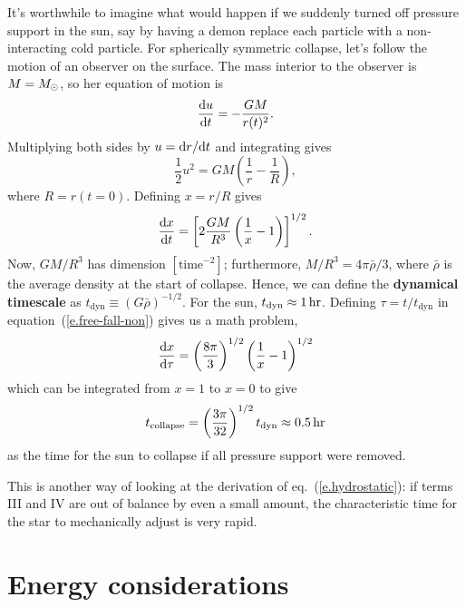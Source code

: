 It's worthwhile to imagine what would happen if we suddenly turned off pressure support in the sun, say by having a demon replace each particle with a non-interacting cold particle. For spherically symmetric collapse, let's follow the motion of an observer on the surface.  The mass interior to the observer is $M = M_\odot$, so her equation of motion is
\begin{equation}\label{e.free-fall-eq-motion}
\frac{\mathrm{d} u}{\mathrm{d} t} = -\frac{GM}{r(t)^{2}}.
\end{equation}
Multiplying both sides by $u = \mathrm{d} r/\mathrm{d} t$ and integrating gives
\[
\frac{1}{2} u^{2} = GM\left(\frac{1}{r} - \frac{1}{R}\right),
\]
where $R = r(t=0)$. Defining $x = r/R$ gives
\begin{equation}\label{e.free-fall-non}
\frac{\mathrm{d} x}{\mathrm{d} t} = \left[2 \frac{GM}{R^{3}}\left(\frac{1}{x}-1\right)\right]^{1/2}.
\end{equation}
Now, $GM/R^{3}$ has dimension $[\textrm{time}^{-2}]$; furthermore, $M/R^{3} = 4\pi\bar{\rho}/3$, where $\bar{\rho}$ is the average density at the start of collapse.
Hence, we can define the \textbf{dynamical timescale} as $t_{\mathrm{dyn}}\equiv (G\bar{\rho})^{-1/2}$.  For the sun, $t_{\mathrm{dyn}}\approx 1\,\mathrm{hr}$.  Defining $\tau = t/t_{\mathrm{dyn}}$ in equation~(\ref{e.free-fall-non}) gives us a math problem,
\[
\frac{\mathrm{d} x}{\mathrm{d}\tau} = \left(\frac{8\pi}{3}\right)^{1/2}\left(\frac{1}{x}-1\right)^{1/2}
\]
which can be integrated from $x = 1$ to $x=0$ to give
\[
t_{\mathrm{collapse}} = \left(\frac{3\pi}{32}\right)^{1/2}t_{\mathrm{dyn}} \approx 0.5\,\mathrm{hr}
\]
as the time for the sun to collapse if all pressure support were removed.

This is another way of looking at the derivation of eq.~(\ref{e.hydrostatic}): if terms III and IV are out of balance by even a small amount, the characteristic time for the star to mechanically adjust is very rapid.

\section{Energy considerations}\label{s.energy-considerations}


